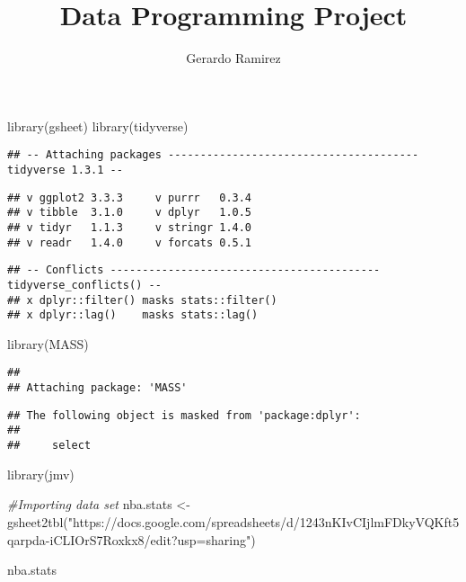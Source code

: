 \documentclass[
]{article}
\title{Data Programming Project}
\author{Gerardo Ramirez}
\date{}
\newenvironment{Shaded}{\begin{snugshade}}{\end{snugshade}}
\newcommand{\CommentTok}[1]{\textcolor[rgb]{0.56,0.35,0.01}{\textit{#1}}}
\newcommand{\FunctionTok}[1]{\textcolor[rgb]{0.00,0.00,0.00}{#1}}
\newcommand{\NormalTok}[1]{#1}
\newcommand{\OtherTok}[1]{\textcolor[rgb]{0.56,0.35,0.01}{#1}}
\newcommand{\StringTok}[1]{\textcolor[rgb]{0.31,0.60,0.02}{#1}}
\begin{document}
\maketitle

\begin{Shaded}
\begin{Highlighting}[]
\FunctionTok{library}\NormalTok{(gsheet)}
\FunctionTok{library}\NormalTok{(tidyverse)}
\end{Highlighting}
\end{Shaded}

\begin{verbatim}
## -- Attaching packages --------------------------------------- tidyverse 1.3.1 --
\end{verbatim}

\begin{verbatim}
## v ggplot2 3.3.3     v purrr   0.3.4
## v tibble  3.1.0     v dplyr   1.0.5
## v tidyr   1.1.3     v stringr 1.4.0
## v readr   1.4.0     v forcats 0.5.1
\end{verbatim}

\begin{verbatim}
## -- Conflicts ------------------------------------------ tidyverse_conflicts() --
## x dplyr::filter() masks stats::filter()
## x dplyr::lag()    masks stats::lag()
\end{verbatim}

\begin{Shaded}
\begin{Highlighting}[]
\FunctionTok{library}\NormalTok{(MASS)}
\end{Highlighting}
\end{Shaded}

\begin{verbatim}
## 
## Attaching package: 'MASS'
\end{verbatim}

\begin{verbatim}
## The following object is masked from 'package:dplyr':
## 
##     select
\end{verbatim}

\begin{Shaded}
\begin{Highlighting}[]
\FunctionTok{library}\NormalTok{(jmv)}
\end{Highlighting}
\end{Shaded}

\begin{Shaded}
\begin{Highlighting}[]
\CommentTok{\#Importing data set}
\NormalTok{nba.stats }\OtherTok{\textless{}{-}} \FunctionTok{gsheet2tbl}\NormalTok{(}\StringTok{"https://docs.google.com/spreadsheets/d/1243nKIvCIjlmFDkyVQKft5qarpda{-}iCLIOrS7Roxkx8/edit?usp=sharing"}\NormalTok{)}

\NormalTok{nba.stats}
\end{Highlighting}
\end{Shaded}
\end{document}
